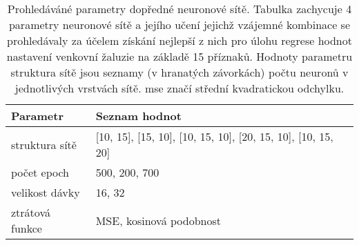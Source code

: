 \begin{table}[htbp]
  \centering
    \begin{tabular}{l|l}
    \toprule
    Parametr & Seznam hodnot \\
    \midrule
    \midrule
    struktura sítě & [10, 15], [15, 10], [10, 15, 10], [20, 15, 10], [10, 15, 20] \\
    \midrule
    počet epoch & 500, 200, 700 \\
    \midrule
    velikost dávky & 16, 32 \\
    \midrule
    ztrátová funkce & MSE, kosinová podobnost \\
    \bottomrule
    \bottomrule
    \end{tabular}%
    \caption[Prohledáváné parametry dopředné neuronové sítě]{Prohledáváné parametry dopředné neuronové sítě. Tabulka zachycuje 4 parametry neuronové sítě a jejího učení jejichž vzájemné kombinace se prohledávaly za účelem získání nejlepší z nich pro úlohu regrese hodnot nastavení venkovní žaluzie na základě 15 příznaků. Hodnoty parametru struktura sítě jsou seznamy (v hranatých závorkách) počtu neuronů v jednotlivých vrstvách sítě. \acrshort{mse} značí střední kvadratickou odchylku.}
  \label{tab:ffnnhyper}%
\end{table}%